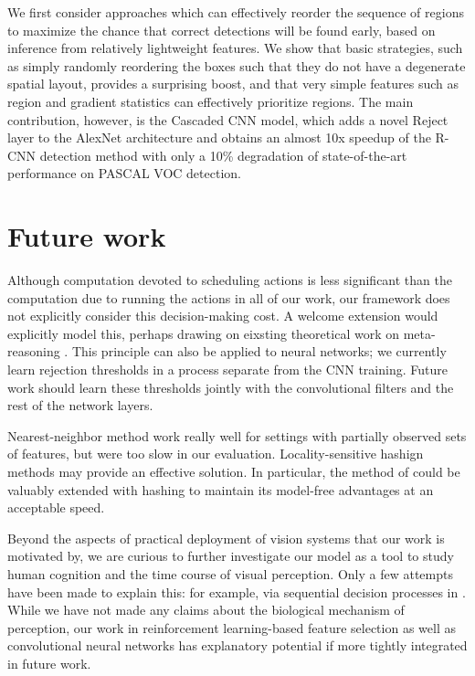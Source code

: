 We first consider approaches which can effectively reorder the sequence of regions to maximize the chance that correct detections will be found early, based on inference from relatively lightweight features.
We show that basic strategies, such as simply randomly reordering the boxes such that they do not have a degenerate spatial layout, provides a surprising boost, and that very simple features such as region and gradient statistics can effectively prioritize regions.
The main contribution, however, is the Cascaded CNN model, which adds a novel Reject layer to the AlexNet architecture and obtains an almost 10x speedup of the R-CNN detection method with only a 10\% degradation of state-of-the-art performance on PASCAL VOC detection.

\section{Future work}

Although computation devoted to scheduling actions is less significant than the computation due to running the actions in all of our work, our framework does not explicitly consider this decision-making cost.
A welcome extension would explicitly model this, perhaps drawing on eixsting theoretical work on meta-reasoning \parencite{Hay2012}.
This principle can also be applied to neural networks; we currently learn rejection thresholds in a process separate from the CNN training.
Future work should learn these thresholds jointly with the convolutional filters and the rest of the network layers.

Nearest-neighbor method work really well for settings with partially observed sets of features, but were too slow in our evaluation.
Locality-sensitive hashign methods may provide an effective solution.
In particular, the method of \cite{Gao-NIPS-2011} could be valuably extended with hashing to maintain its model-free advantages at an acceptable speed.

Beyond the aspects of practical deployment of vision systems that our work is motivated by, we are curious to further investigate our model as a tool to study human cognition and the time course of visual perception.
Only a few attempts have been made to explain this: for example, via sequential decision processes in \textcite{Hegde-Neuro-2008}.
While we have not made any claims about the biological mechanism of perception, our work in reinforcement learning-based feature selection as well as convolutional neural networks has explanatory potential if more tightly integrated in future work.
